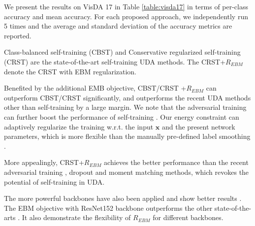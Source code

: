\documentclass[a4paper,conference]{IEEEtran}
\theoremstyle{plain}%
\begin{document}
 

We present the results on VisDA 17 in Table \ref{table:visda17} in terms of per-class accuracy and mean accuracy. For each proposed approach, we independently run 5 times and the average and standard deviation of the accuracy metrics are reported.

Class-balanced self-training (CBST) and Conservative regularized self-training (CRST) \cite{zou2019confidence} are the state-of-the-art self-training UDA methods. The CRST+$R_{EBM}$ denote the CRST with EBM regularization.



Benefited by the additional EMB objective, CBST/CRST +$R_{EBM}$ can outperform CBST/CRST significantly, and outperforms the recent UDA methods other than self-training by a large margin. We note that the adversarial training can further boost the performance of self-training \cite{zou2019confidence}. Our energy constraint can adaptively regularize the training w.r.t. the input $\mathbf{x}$ and the present network parameters, which is more flexible than the manually pre-defined label smoothing \cite{zou2019confidence}.  








 

 


More appealingly, CRST+$R_{EBM}$ achieves the better performance than the recent adversarial training \cite{gholami2019taskdiscriminative}, dropout \cite{saito2017adversarial} and moment matching methods, which revokes the potential of self-training in UDA.  













The more powerful backbones have also been applied and show better results \cite{pinheiro2018unsupervised,sankaranarayanan2018generate}. The EBM objective with ResNet152 backbone outperforms the other state-of-the-arts \cite{pinheiro2018unsupervised,sankaranarayanan2018generate}. It also demonstrate the flexibility of $R_{EBM}$ for different backbones.





\end{document}
